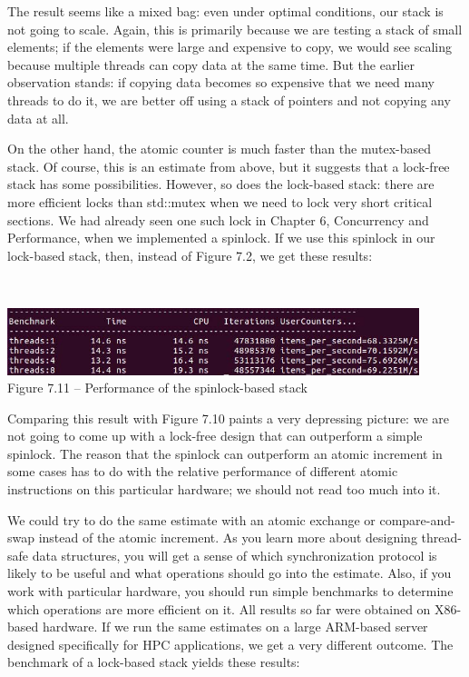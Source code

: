 The result seems like a mixed bag: even under optimal conditions, our stack is not going to scale. Again, this is primarily because we are testing a stack of small elements; if the elements were large and expensive to copy, we would see scaling because multiple threads can copy data at the same time. But the earlier observation stands: if copying data becomes so expensive that we need many threads to do it, we are better off using a stack of pointers and not copying any data at all.

On the other hand, the atomic counter is much faster than the mutex-based stack. Of course, this is an estimate from above, but it suggests that a lock-free stack has some possibilities. However, so does the lock-based stack: there are more efficient locks than std::mutex when we need to lock very short critical sections. We had already seen one such lock in Chapter 6, Concurrency and Performance, when we implemented a spinlock. If we use this spinlock in our lock-based stack, then, instead of Figure 7.2, we get these results:

\hspace*{\fill} \\ %
\begin{center}
\includegraphics[width=0.9\textwidth]{content/2/chapter7/images/11.jpg}\\
Figure 7.11 – Performance of the spinlock-based stack
\end{center}

Comparing this result with Figure 7.10 paints a very depressing picture: we are not going to come up with a lock-free design that can outperform a simple spinlock. The reason that the spinlock can outperform an atomic increment in some cases has to do with the relative performance of different atomic instructions on this particular hardware; we should not read too much into it.

We could try to do the same estimate with an atomic exchange or compare-and-swap instead of the atomic increment. As you learn more about designing thread-safe data structures, you will get a sense of which synchronization protocol is likely to be useful and what operations should go into the estimate. Also, if you work with particular hardware, you should run simple benchmarks to determine which operations are more efficient on it. All results so far were obtained on X86-based hardware. If we run the same estimates on a large ARM-based server designed specifically for HPC applications, we get a very different outcome. The benchmark of a lock-based stack yields these results:

